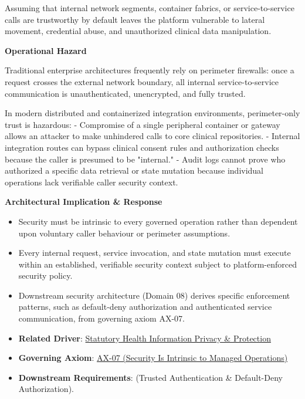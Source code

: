 Assuming that internal network segments, container fabrics, or service-to-service calls are trustworthy by default leaves the platform vulnerable to lateral movement, credential abuse, and unauthorized clinical data manipulation.



\par\medskip\textbf{Operational Hazard}\par


Traditional enterprise architectures frequently rely on perimeter firewalls: once a request crosses the external network boundary, all internal service-to-service communication is unauthenticated, unencrypted, and fully trusted.



In modern distributed and containerized integration environments, perimeter-only trust is hazardous:
- Compromise of a single peripheral container or gateway allows an attacker to make unhindered calls to core clinical repositories.
- Internal integration routes can bypass clinical consent rules and authorization checks because the caller is presumed to be "internal."
- Audit logs cannot prove who authorized a specific data retrieval or state mutation because individual operations lack verifiable caller security context.



\par\medskip\textbf{Architectural Implication \& Response}\par


\begin{itemize}


\item Security must be intrinsic to every governed operation rather than dependent upon voluntary caller behaviour or perimeter assumptions.

\item Every internal request, service invocation, and state mutation must execute within an established, verifiable security context subject to platform-enforced security policy.

\item Downstream security architecture (Domain 08) derives specific enforcement patterns, such as default-deny authorization and authenticated service communication, from governing axiom AX-07.

\item \textbf{Related Driver}: \href{\detokenize{../../../../../docs/markdown/01-motivation/drivers-assessments/drivers.md}}{Statutory Health Information Privacy \& Protection}

\item \textbf{Governing Axiom}: \hyperref[element:5de2ae2c3b794c2d9f3a14efd51d564f]{AX-07 (Security Is Intrinsic to Managed Operations)}

\item \textbf{Downstream Requirements}: \texttt{} (Trusted Authentication \& Default-Deny Authorization).

\end{itemize}

